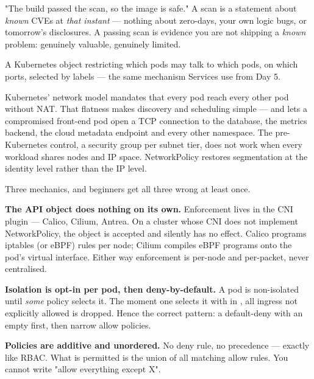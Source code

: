 \begin{misconception}
"The build passed the scan, so the image is safe." A scan is a statement about \emph{known} CVEs at \emph{that instant} --- nothing about zero-days, your own logic bugs, or tomorrow's disclosures. A passing scan is evidence you are not shipping a \emph{known} problem: genuinely valuable, genuinely limited.
\end{misconception}


 A Kubernetes object restricting which pods may talk to which pods, on which ports, selected by labels --- the same mechanism Services use from Day 5.

 Kubernetes' network model mandates that every pod reach every other pod without NAT. That flatness makes discovery and scheduling simple --- and lets a compromised front-end pod open a TCP connection to the database, the metrics backend, the cloud metadata endpoint and every other namespace. The pre-Kubernetes control, a security group per subnet tier, does not work when every workload shares nodes and IP space. NetworkPolicy restores segmentation at the identity level rather than the IP level.

 Three mechanics, and beginners get all three wrong at least once.

\begin{wbitem}
  \item \textbf{The API object does nothing on its own.} Enforcement lives in the CNI plugin --- Calico, Cilium, Antrea. On a cluster whose CNI does not implement NetworkPolicy, the object is accepted and silently has no effect. Calico programs iptables (or eBPF) rules per node; Cilium compiles eBPF programs onto the pod's virtual interface. Either way enforcement is per-node and per-packet, never centralised.
  \item \textbf{Isolation is opt-in per pod, then deny-by-default.} A pod is non-isolated until \emph{some} policy selects it. The moment one selects it with  in , all ingress not explicitly allowed is dropped. Hence the correct pattern: a default-deny with an empty  first, then narrow allow policies.
  \item \textbf{Policies are additive and unordered.} No deny rule, no precedence --- exactly like RBAC. What is permitted is the union of all matching allow rules. You cannot write "allow everything except X".
\end{wbitem}

